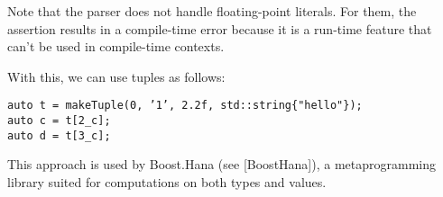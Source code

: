 Note that the parser does not handle floating-point literals. For them, the assertion results in a compile-time error because it is a run-time feature that can’t be used in compile-time contexts.

With this, we can use tuples as follows:

\begin{lstlisting}[style=styleCXX]
auto t = makeTuple(0, ’1’, 2.2f, std::string{"hello"});
auto c = t[2_c];
auto d = t[3_c];
\end{lstlisting}

This approach is used by Boost.Hana (see [BoostHana]), a metaprogramming library suited for computations on both types and values.



























